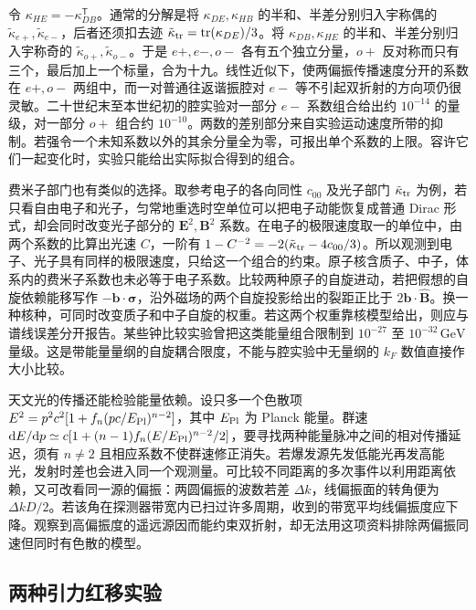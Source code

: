 令 $\kappa_{HE}=-\kappa_{DB}^{\mathsf T}$。通常的分解是将 $\kappa_{DE},\kappa_{HB}$ 的半和、半差分别归入宇称偶的 $\tilde\kappa_{e+},\tilde\kappa_{e-}$，后者还须扣去迹 $\tilde\kappa_{\rm tr}=\operatorname{tr}(\kappa_{DE})/3$。将 $\kappa_{DB},\kappa_{HE}$ 的半和、半差分别归入宇称奇的 $\tilde\kappa_{o+},\tilde\kappa_{o-}$。于是 $e+,e-,o-$ 各有五个独立分量，$o+$ 反对称而只有三个，最后加上一个标量，合为十九。线性近似下，使两偏振传播速度分开的系数在 $e+,o-$ 两组中，而一对普通往返谐振腔对 $e-$ 等不引起双折射的方向项仍很灵敏。二十世纪末至本世纪初的腔实验对一部分 $e-$ 系数组合给出约 $10^{-14}$ 的量级，对一部分 $o+$ 组合约 $10^{-10}$。两数的差别部分来自实验运动速度所带的抑制。若强令一个未知系数以外的其余分量全为零，可报出单个系数的上限。容许它们一起变化时，实验只能给出实际拟合得到的组合。

费米子部门也有类似的选择。取参考电子的各向同性 $c_{00}$ 及光子部门 $\tilde\kappa_{\rm tr}$ 为例，若只看自由电子和光子，匀常地重选时空单位可以把电子动能恢复成普通 Dirac 形式，却会同时改变光子部分的 $\bm E^2,\bm B^2$ 系数。在电子的极限速度取一的单位中，由两个系数的比算出光速 $C$，一阶有
$1-C^{-2}=-2(\tilde\kappa_{\rm tr}-4c_{00}/3)$。所以观测到电子、光子具有同样的极限速度，只给这一个组合的约束。原子核含质子、中子，体系内的费米子系数也未必等于电子系数。比较两种原子的自旋进动，若把假想的自旋依赖能移写作 $-\bm b\cdot\bm\sigma$，沿外磁场的两个自旋投影给出的裂距正比于 $2\bm b\cdot\hat{\bm B}$。换一种核种，可同时改变质子和中子自旋的权重。若这两个权重靠核模型给出，则应与谱线误差分开报告。某些钟比较实验曾把这类能量组合限制到 $10^{-27}$ 至 $10^{-32}\,\mathrm{GeV}$ 量级。这是带能量量纲的自旋耦合限度，不能与腔实验中无量纲的 $k_F$ 数值直接作大小比较。

天文光的传播还能检验能量依赖。设只多一个色散项 $E^2=p^2c^2[1+f_n(pc/E_{\rm Pl})^{n-2}]$，其中 $E_{\rm Pl}$ 为 Planck 能量。群速 $\mathrm dE/\mathrm dp\simeq c[1+(n-1)f_n(E/E_{\rm Pl})^{n-2}/2]$，要寻找两种能量脉冲之间的相对传播延迟，须有 $n\ne2$ 且相应系数不使群速修正消失。若爆发源先发低能光再发高能光，发射时差也会进入同一个观测量。可比较不同距离的多次事件以利用距离依赖，又可改看同一源的偏振：两圆偏振的波数若差 $\Delta k$，线偏振面的转角便为 $\Delta kD/2$。若该角在探测器带宽内已扫过许多周期，收到的带宽平均线偏振度应下降。观察到高偏振度的遥远源因而能约束双折射，却无法用这项资料排除两偏振同速但同时有色散的模型。

\subsection{两种引力红移实验}

